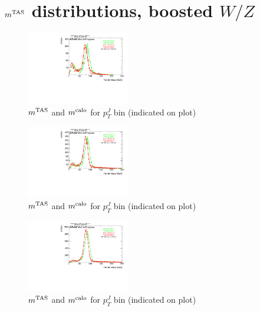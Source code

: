 \newpage
\clearpage
\vspace*{\fill}
\section{$m^\textrm{TAS}$ distributions, boosted $W/Z$}
\vfill
\clearpage
\twocolumn

\begin{figure}
 
\includegraphics[width=0.4\textwidth]{appendixB/mTAS_W_calibmCal_20:07:01-03-11-2016/12cfrt_h_FatJet_ptJ01m.pdf}
\caption{$m^\textrm{TAS}$ and $m^\textrm{calo}$ for $p_{T}^{J}$ bin (indicated on plot) }
 
\end{figure}
 
\begin{figure}
 
\includegraphics[width=0.4\textwidth]{appendixB/mTAS_W_calibmCal_20:07:01-03-11-2016/12cfrt_h_FatJet_ptJ02m.pdf}
\caption{$m^\textrm{TAS}$ and $m^\textrm{calo}$ for $p_{T}^{J}$ bin (indicated on plot) }
 
\end{figure}
 
\begin{figure}
 
\includegraphics[width=0.4\textwidth]{appendixB/mTAS_W_calibmCal_20:07:01-03-11-2016/12cfrt_h_FatJet_ptJ03m.pdf}
\caption{$m^\textrm{TAS}$ and $m^\textrm{calo}$ for $p_{T}^{J}$ bin (indicated on plot) }
 
\end{figure}
 
